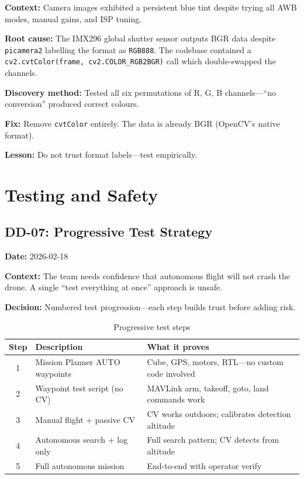 \documentclass[10pt,a4paper]{article}
\newcommand{\compactTable}{\small\setlength{\tabcolsep}{3pt}\renewcommand{\arraystretch}{1.05}}
\newcommand{\ddlabel}[1]{\textbf{\color{headblue}#1}\hspace{0.5em}}
\begin{document}
\ddlabel{Context:} Camera images exhibited a persistent blue tint despite trying all AWB modes, manual gains, and ISP tuning.

\ddlabel{Root cause:} The IMX296 global shutter sensor outputs BGR data despite \texttt{picamera2} labelling the format as \texttt{RGB888}. The codebase contained a \texttt{cv2.cvtColor(frame, cv2.COLOR\_RGB2BGR)} call which double-swapped the channels.

\ddlabel{Discovery method:} Tested all six permutations of R, G, B channels---``no conversion'' produced correct colours.

\begin{decisionbox}
\textbf{Fix:} Remove \texttt{cvtColor} entirely. The data is already BGR (OpenCV's native format).
\end{decisionbox}

\ddlabel{Lesson:} Do not trust format labels---test empirically.

\section{Testing and Safety}

\subsection{DD-07: Progressive Test Strategy}
\label{sec:dd07}

\ddlabel{Date:} 2026-02-18

\ddlabel{Context:} The team needs confidence that autonomous flight will not crash the drone. A single ``test everything at once'' approach is unsafe.

\begin{decisionbox}
\textbf{Decision:} Numbered test progression---each step builds trust before adding risk.
\end{decisionbox}

\begin{table}[H]
\centering
\compactTable
\caption{Progressive test steps}
\label{tab:dd07-steps}
\begin{tabularx}{\textwidth}{c l X}
\toprule
\textbf{Step} & \textbf{Description} & \textbf{What it proves} \\
\midrule
1 & Mission Planner AUTO waypoints & Cube, GPS, motors, RTL---no custom code involved \\
2 & Waypoint test script (no CV) & MAVLink arm, takeoff, goto, land commands work \\
3 & Manual flight + passive CV & CV works outdoors; calibrates detection altitude \\
4 & Autonomous search + log only & Full search pattern; CV detects from altitude \\
5 & Full autonomous mission & End-to-end with operator verify \\
\bottomrule
\end{tabularx}
\end{table}
\end{document}
